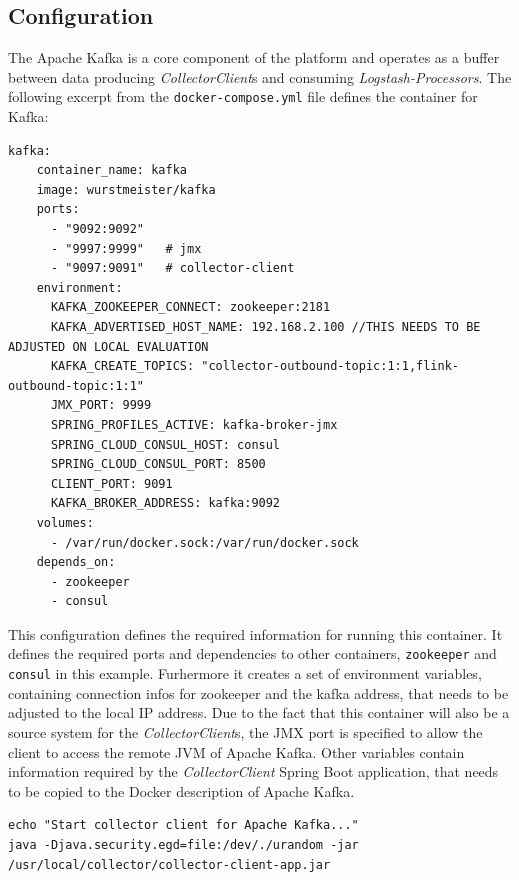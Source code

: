 \subsection{Configuration}

The Apache Kafka is a core component of the platform and operates as a buffer between data producing \textit{CollectorClient}s and consuming
\textit{Logstash-Processors}. The following excerpt from the \verb|docker-compose.yml| file defines the container for Kafka:
\begin{lstlisting}[caption={Container definition Kafka}, captionpos=b, label={lst:docker-kafka}]
  kafka:
    container_name: kafka
    image: wurstmeister/kafka
    ports:
      - "9092:9092"
      - "9997:9999"   # jmx
      - "9097:9091"   # collector-client
    environment:
      KAFKA_ZOOKEEPER_CONNECT: zookeeper:2181
      KAFKA_ADVERTISED_HOST_NAME: 192.168.2.100 //THIS NEEDS TO BE ADJUSTED ON LOCAL EVALUATION
      KAFKA_CREATE_TOPICS: "collector-outbound-topic:1:1,flink-outbound-topic:1:1"
      JMX_PORT: 9999
      SPRING_PROFILES_ACTIVE: kafka-broker-jmx
      SPRING_CLOUD_CONSUL_HOST: consul
      SPRING_CLOUD_CONSUL_PORT: 8500
      CLIENT_PORT: 9091
      KAFKA_BROKER_ADDRESS: kafka:9092
    volumes:
      - /var/run/docker.sock:/var/run/docker.sock
    depends_on:
      - zookeeper
      - consul
\end{lstlisting}

This configuration defines the required information for running this container. It defines the required ports and dependencies to other containers,
\verb|zookeeper| and \verb|consul| in this example. Furhermore it creates a set of environment variables, containing
connection infos for zookeeper and the kafka address, that needs to be adjusted to the local IP address. Due to the fact that
this container will also be a source system for the \textit{CollectorClient}s, the JMX port is specified to allow the client to access
the remote JVM of Apache Kafka. Other variables contain information
required by the \textit{CollectorClient} Spring Boot application, that needs to be copied to the Docker description of Apache Kafka.

\begin{lstlisting}[caption={CollectorManager copy in Apache Kafka conatiner}, captionpos=b, label={lst:docker-copy-client}]
echo "Start collector client for Apache Kafka..."
java -Djava.security.egd=file:/dev/./urandom -jar /usr/local/collector/collector-client-app.jar
\end{lstlisting}

